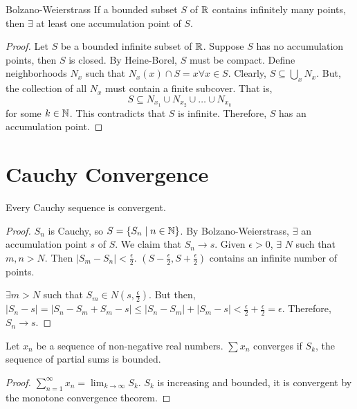 \begin{theorem}{Bolzano-Weierstrass}{}
    If a bounded subset $S$ of $\mathbb{R}$ contains infinitely many points, then $\exists$ at least one accumulation point of $S$.
\end{theorem}
\begin{proof}
    Let $S$ be a bounded infinite subset of $\mathbb{R}$. Suppose $S$ has no accumulation points, then $S$ is closed. By Heine-Borel, $S$ must be compact. Define neighborhoods $N_x$ such that $N_x(x) \cap S = {x} \forall x \in S$. Clearly, $S \subseteq \bigcup_x N_x$. But, the collection of all $N_x$ must contain a finite subcover. That is, $$S \subseteq N_{x_1} \cup N_{x_2} \cup \ldots \cup N_{x_k}$$ for some $k \in \mathbb{N}$. This contradicts that $S$ is infinite. Therefore, $S$ has an accumulation point.
\end{proof}

\section{Cauchy Convergence}
\begin{theorem}{}{}
    Every Cauchy sequence is convergent.
\end{theorem}
\begin{proof}
    $S_n$ is Cauchy, so $S = \{S_n \mid n \in \mathbb{N}\}$. By Bolzano-Weierstrass, $\exists$ an accumulation point $s$ of $S$. We claim that $S_n \rightarrow s$. Given $\epsilon > 0$, $\exists$ $N$ such that $m, n > N$. Then $|S_m - S_n| < \frac{\epsilon}{2}$. $(S - \frac{\epsilon}{2}, S + \frac{\epsilon}{2})$ contains an infinite number of points. 
    
    $\exists m > N$ such that $S_m \in N(s, \frac{\epsilon}{2})$. But then, $|S_n - s| = |S_n - S_m + S_m - s| \leq |S_n - S_m| + |S_m - s| < \frac{\epsilon}{2} + \frac{\epsilon}{2} = \epsilon$. Therefore, $S_n \rightarrow s$.
\end{proof}

\begin{theorem}{}{}
    Let $x_n$ be a sequence of non-negative real numbers. $\sum x_n$ converges if $S_k$, the sequence of partial sums is bounded.
\end{theorem}
\begin{proof}
    $\sum_{n=1}^\infty x_n = \lim_{k \to \infty} S_k$. $S_k$ is increasing and bounded, it is convergent by the monotone convergence theorem.
\end{proof}